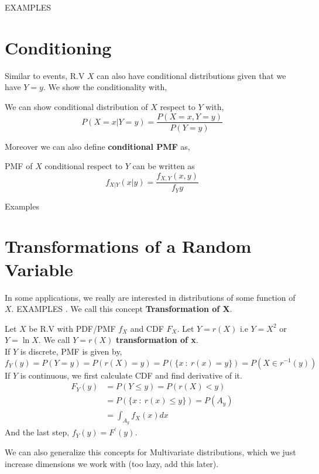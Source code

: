 EXAMPLES \\
\lipsum[1-3]
\section{Conditioning}
Similar to events, R.V $X$ can also have conditional distributions given that we have $Y=y$. We show the conditionality with,
\begin{definition}
    We can show conditional distribution of $X$ respect to $Y$ with,
    \[P(X=x| Y=y) = \frac{ P(X=x,Y=y)}{P(Y=y)} \]
\end{definition}
Moreover we can also define \textbf{conditional PMF} as,
\begin{definition}
    PMF of $X$ conditional respect to $Y$ can be written as 
    \[ f_{X|Y}(x|y)= \frac{f_{X,Y}(x,y)}{f_Y{y}}\]
\end{definition}

Examples \\
\lipsum[1-5]


\section{Transformations of a Random Variable}
In some applications, we really are interested in distributions of some function of $X$. EXAMPLES \lipsum[1-1]. We call this concept \textbf{Transformation of X}.
\begin{definition}
    Let $X$ be R.V with PDF/PMF $f_X$ and CDF $F_X$. Let $Y=r(X)$ i.e $Y=X^2$ or $Y = \ln X$. We call $Y=r(X)$ \textbf{transformation of x}. \\
    \newline
    If $Y$ is discrete, PMF is given by,
    \[f_Y(y)= P(Y=y) =  P( r(X) = y) = P( \{x \ : \ r(x) = y\})= P( X \in r^{-1}(y)) \]
    \newline
    If $Y$ is continuous, we first calculate CDF and find derivative of it. 
    \begin{align*}
        F_Y(y) &= P( Y \le y) = P(r(X) < y) \\
               &= P(\{x \ : \ r(x) \le y \}) = P( A_y)    \\
               &= \int_{A_y} f_X(x)dx
    \end{align*}
    And the last step, $f_Y(y) = F^{'}(y)$.
\end{definition}
We can also generalize this concepts for Multivariate distributions, which we just increase dimensions we work with (too lazy, add this later).
